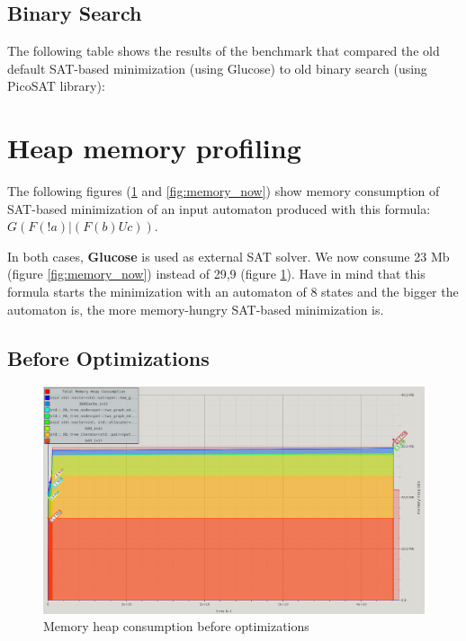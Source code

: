 \begin{landscape}
\subsection{Binary Search}
\label{glu_vs_dicho_complete}
The following table shows the results of the benchmark that compared the old default SAT-based minimization
(using Glucose) to old binary search (using PicoSAT library):\\

\section{Heap memory profiling}
\label{memory_profiling}

The following figures (\ref{fig:memory_before} and \ref{fig:memory_now}) show memory consumption
of SAT-based minimization of an input automaton produced with this formula: $G(F(!a) | (F(b) U c))$.

In both cases, \textbf{Glucose} is used as external SAT solver. We now consume 23 Mb
(figure \ref{fig:memory_now}) instead of 29,9 (figure \ref{fig:memory_before}). Have in mind that
this formula starts the minimization with an automaton of 8 states and the bigger the automaton is, the
more memory-hungry SAT-based minimization is.

\subsection{Before Optimizations}

\begin{figure}[H]
 \centering
 \includegraphics[scale=0.6]{img/memory_before.png}
 \caption{Memory heap consumption before optimizations}
 \label{fig:memory_before}
\end{figure}


\end{landscape}
